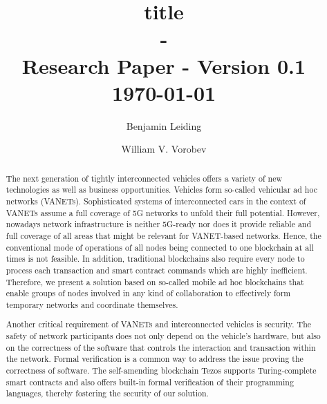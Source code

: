 \documentclass{llncs}
\begin{document}
	{
	\title{title\\ - \\ \small Research Paper - Version 0.1\\\small \today}
	
	\author{Benjamin Leiding \and William V. Vorobev}
	
	
	\maketitle


	\begin{abstract}


		The next generation of tightly interconnected vehicles offers a variety of new technologies as well as business opportunities. Vehicles form so-called vehicular ad hoc networks (VANETs). Sophisticated systems of interconnected cars in the context of VANETs assume a full coverage of 5G networks to unfold their full potential. However, nowadays network infrastructure is neither 5G-ready nor does it provide reliable and full coverage of all areas that might be relevant for VANET-based networks. Hence, the conventional mode of operations of all nodes being connected to one blockchain at all times is not feasible. In addition, traditional blockchains also require every node to process each transaction and smart contract commands which are highly inefficient. Therefore, we present a solution based on so-called mobile ad hoc blockchains that enable groups of nodes involved in any kind of collaboration to effectively form temporary networks and coordinate themselves. 

		Another critical requirement of VANETs and interconnected vehicles is security. The safety of network participants does not only depend on the vehicle's hardware, but also on the correctness of the software that controls the interaction and transaction within the network. Formal verification is a common way to address the issue proving the correctness of software. The self-amending blockchain Tezos supports Turing-complete smart contracts and also offers built-in formal verification of their programming languages, thereby fostering the security of our solution.


\end{abstract}}
\end{document}
